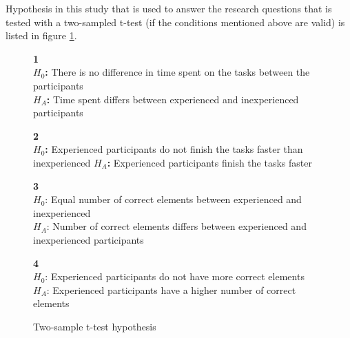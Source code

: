 
Hypothesis in this study that is used to answer the research questions that is tested with a two-sampled t-test (if the conditions mentioned above are valid) is listed in figure \ref{fig:hypothesis_ttest}. 

\begin{figure}[H]
	\begin{framed}\centering
		\textbf{1}\\
		\textbf{$H_{0}$:} There is no difference in time spent on the tasks between the participants\\
		\textbf{$H_{A}$:} Time spent differs between experienced and inexperienced participants \newline
		
		\textbf{2}\\
		\textbf{$H_{0}$:} Experienced participants do not finish the tasks faster than inexperienced\newline
		\textbf{$H_{A}$:} Experienced participants finish the tasks faster\newline
		
		\textbf{3}\\
		$H_{0}$: Equal number of correct elements between experienced and inexperienced \\
		$H_{A}$: Number of correct elements differs between experienced and inexperienced participants\newline
		
		\textbf{4}\\
		$H_{0}$: Experienced participants do not have more correct elements\\
		$H_{A}$: Experienced participants have a higher number of correct elements\newline
	\end{framed}
	\caption{Two-sample t-test hypothesis}
	\label{fig:hypothesis_ttest}
\end{figure}

